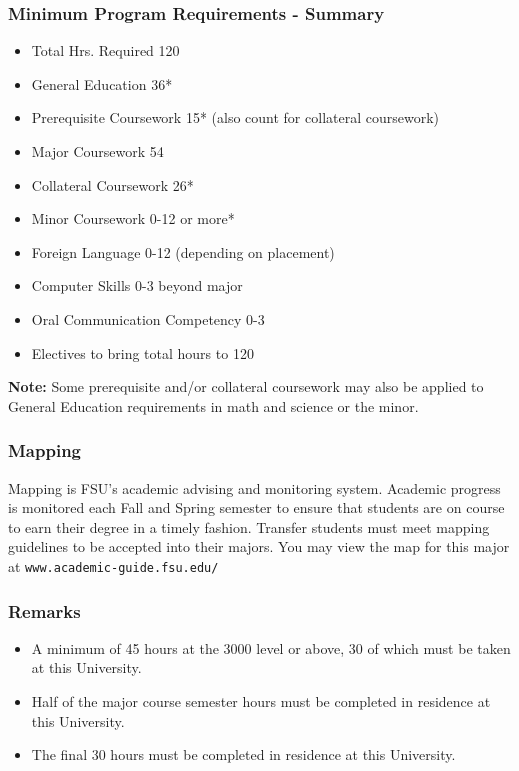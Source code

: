 \documentclass[12pt,a4paper]{article}
\begin{document}
\subsubsection*{Minimum Program Requirements - Summary}
\begin{itemize}
    \item Total Hrs. Required 120
    \item General Education 36*
    \item Prerequisite Coursework 15* (also count for collateral coursework)
    \item Major Coursework 54
    \item Collateral Coursework 26*
    \item Minor Coursework 0-12 or more*
    \item Foreign Language 0-12 (depending on placement)
    \item Computer Skills 0-3 beyond major
    \item Oral Communication Competency 0-3
    \item Electives to bring total hours to 120
\end{itemize}
\textbf{Note:} Some prerequisite and/or collateral coursework may also be applied to General Education requirements in math and science or the minor.

\subsubsection*{Mapping}
Mapping is FSU’s academic advising and monitoring system. Academic progress is monitored each Fall and Spring semester to ensure that students are on course to earn their degree in a timely fashion. Transfer students must meet mapping guidelines to be accepted into their majors. You may view the map for this major at \texttt{www.academic-guide.fsu.edu/}

\subsubsection*{Remarks}
\begin{itemize}
    \item A minimum of 45 hours at the 3000 level or above, 30 of which must be taken at this University.
    \item Half of the major course semester hours must be completed in residence at this University.
    \item The final 30 hours must be completed in residence at this University.
\end{itemize}
\end{document}
